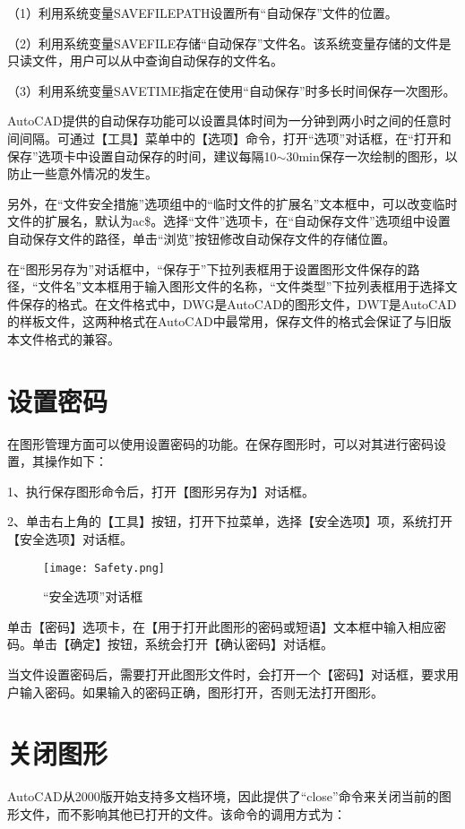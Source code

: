 （1）利用系统变量SAVEFILEPATH设置所有“自动保存”文件的位置。

（2）利用系统变量SAVEFILE存储“自动保存”文件名。该系统变量存储的文件是只读文件，用户可以从中查询自动保存的文件名。

（3）利用系统变量SAVETIME指定在使用“自动保存”时多长时间保存一次图形。

AutoCAD提供的自动保存功能可以设置具体时间为一分钟到两小时之间的任意时间间隔。可通过【工具】菜单中的【选项】命令，打开“选项”对话框，在“打开和保存”选项卡中设置自动保存的时间，建议每隔10$\sim$30min保存一次绘制的图形，以防止一些意外情况的发生。

另外，在“文件安全措施”选项组中的“临时文件的扩展名”文本框中，可以改变临时文件的扩展名，默认为ac\$。选择“文件”选项卡，在“自动保存文件”选项组中设置自动保存文件的路径，单击“浏览”按钮修改自动保存文件的存储位置。

在“图形另存为”对话框中，“保存于”下拉列表框用于设置图形文件保存的路径，“文件名”文本框用于输入图形文件的名称，“文件类型”下拉列表框用于选择文件保存的格式。在文件格式中，DWG是AutoCAD的图形文件，DWT是AutoCAD的样板文件，这两种格式在AutoCAD中最常用，保存文件的格式会保证了与旧版本文件格式的兼容。

\chapter{设置密码}

在图形管理方面可以使用设置密码的功能。在保存图形时，可以对其进行密码设置，其操作如下：

1、执行保存图形命令后，打开【图形另存为】对话框。

2、单击右上角的【工具】按钮，打开下拉菜单，选择【安全选项】项，系统打开【安全选项】对话框。

\begin{figure}[htbp]
\centering
\texttt{[image: Safety.png]}
\caption{“安全选项”对话框}
\end{figure}

单击【密码】选项卡，在【用于打开此图形的密码或短语】文本框中输入相应密码。单击【确定】按钮，系统会打开【确认密码】对话框。

当文件设置密码后，需要打开此图形文件时，会打开一个【密码】对话框，要求用户输入密码。如果输入的密码正确，图形打开，否则无法打开图形。

\chapter{关闭图形}

AutoCAD从2000版开始支持多文档环境，因此提供了“close”命令来关闭当前的图形文件，而不影响其他已打开的文件。该命令的调用方式为：


